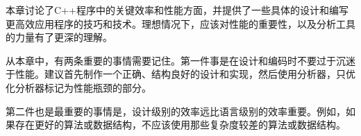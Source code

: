 本章讨论了C++程序中的关键效率和性能方面，并提供了一些具体的设计和编写更高效应用程序的技巧和技术。理想情况下，应该对性能的重要性，以及分析工具的力量有了更深的理解。

从本章中，有两条重要的事情需要记住。第一件事是在设计和编码时不要过于沉迷于性能。建议首先制作一个正确、结构良好的设计和实现，然后使用分析器，只优化分析器标记为性能瓶颈的部分。

第二件也是最重要的事情是，设计级别的效率远比语言级别的效率重要。例如，如果存在更好的算法或数据结构，不应该使用那些复杂度较差的算法或数据结构。
